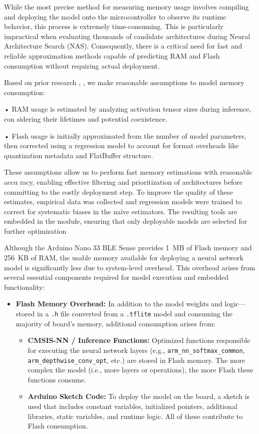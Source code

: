 While the most precise method for measuring memory usage involves compiling and deploying the model onto the microcontroller to observe its runtime behavior, this process is extremely time-consuming. This is particularly impractical when evaluating thousands of candidate architectures during Neural Architecture Search (NAS). Consequently, there is a critical need for fast and reliable approximation methods capable of predicting RAM and Flash consumption without requiring actual deployment.


Based on prior research \cite{tensorflow_RamEstimation}, \cite{liberis2019neural} , we make reasonable assumptions to model
memory consumption:

• RAM usage is estimated by analyzing activation tensor sizes during inference, con
sidering their lifetimes and potential coexistence.

• Flash usage is initially approximated from the number of model parameters, then
corrected using a regression model to account for format overheads like quantization
metadata and FlatBuffer structure.

These assumptions allow us to perform fast memory estimations with reasonable accu
racy, enabling effective filtering and prioritization of architectures before committing to
the costly deployment step. To improve the quality of these estimates, empirical data
was collected and regression models were trained to correct for systematic biases in the
naïve estimators. The resulting tools are embedded in the module, ensuring that only
deployable models are selected for further optimization

Although the Arduino Nano 33 BLE Sense provides 1~MB of Flash memory and 256~KB of RAM, the usable memory available for deploying a neural network model is significantly less due to system-level overhead. This overhead arises from several essential components required for model execution and embedded functionality:

\begin{itemize}
    \item \textbf{Flash Memory Overhead:} In addition to the model weights and logic—stored in a \texttt{.h} file converted from a \texttt{.tflite} model and consuming the majority of board's memory, additional consumption arises from:
    \begin{itemize}
        \item \textbf{CMSIS-NN / Inference Functions:} Optimized functions responsible for executing the neural network layers (e.g., \texttt{arm\_nn\_softmax\_common}, \texttt{arm\_depthwise\_conv\_opt}, etc.) are stored in Flash memory. The more complex the model (i.e., more layers or operations), the more Flash these functions consume.
        \item \textbf{Arduino Sketch Code:} To deploy the model on the board, a sketch is used that includes constant variables, initialized pointers, additional libraries, static variables, and runtime logic. All of these contribute to Flash consumption.
    \end{itemize}
\end{itemize}

